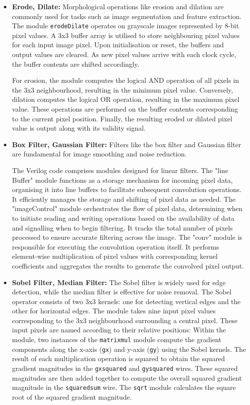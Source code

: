 \begin{itemize}
    \item \textbf{Erode, Dilate:} Morphological operations like erosion and dilation are commonly used for tasks such as image segmentation and feature extraction. 
     The module \texttt{erodeDilate} operates on grayscale images represented by 8-bit pixel values. A 3x3 buffer array is utilised to store neighbouring pixel values for each input image pixel. Upon initialisation or reset, the buffers and output values are cleared. As new pixel values arrive with each clock cycle, the buffer contents are shifted accordingly. 
    
    For erosion, the module computes the logical AND operation of all pixels in the 3x3 neighbourhood, resulting in the minimum pixel value. Conversely, dilation computes the logical OR operation, resulting in the maximum pixel value. These operations are performed on the buffer contents corresponding to the current pixel position. Finally, the resulting eroded or dilated pixel value is output along with its validity signal.
    
    \item \textbf{Box Filter, Gaussian Filter:} Filters like the box filter and Gaussian filter are fundamental for image smoothing and noise reduction. 

    The Verilog code comprises modules designed for linear filters. The "line Buffer" module functions as a storage mechanism for incoming pixel data, organising it into line buffers to facilitate subsequent convolution operations. It efficiently manages the storage and shifting of pixel data as needed. The "imageControl" module orchestrates the flow of pixel data, determining when to initiate reading and writing operations based on the availability of data and signalling when to begin filtering. It tracks the total number of pixels processed to ensure accurate filtering across the image. The "conv" module is responsible for executing the convolution operation itself. It performs element-wise multiplication of pixel values with corresponding kernel coefficients and aggregates the results to generate the convolved pixel output.
    
    \item \textbf{Sobel Filter, Median Filter:} The Sobel filter is widely used for edge detection, while the median filter is effective for noise removal. The Sobel operator consists of two 3x3 kernels: one for detecting vertical edges and the other for horizontal edges. The module takes nine input pixel values corresponding to the 3x3 neighbourhood surrounding a central pixel. These input pixels are named according to their relative positions: Within the module, two instances of the \texttt{matrix\textunderscore mul} module compute the gradient components along the x-axis (\texttt{gx}) and y-axis (\texttt{gy}) using the Sobel kernels. The result of each multiplication operation is squared to obtain the squared gradient magnitudes in the \texttt{gx\textunderscore squared} and \texttt{gy\textunderscore squared} wires. These squared magnitudes are then added together to compute the overall squared gradient magnitude in the \texttt{squared\textunderscore sum} wire. The \texttt{sqrt} module calculates the square root of the squared gradient magnitude.


\end{itemize}
